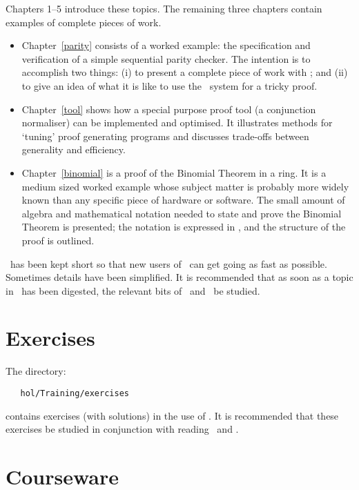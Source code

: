 Chapters 1--5 introduce these topics. The remaining three chapters
contain examples of complete pieces of work.
\begin{itemize}
\item Chapter~\ref{parity}
consists of a worked example: the specification and
verification of a simple sequential parity checker.  The intention is
to   accomplish two things:
(i) to present a complete piece of work with \HOL; and
(ii) to give an idea of what it is like to use the \HOL\
system for a tricky proof.  

\item Chapter~\ref{tool} shows how a special purpose proof tool (a conjunction
normaliser) can be implemented and optimised. It illustrates methods for
`tuning' proof generating programs and discusses trade-offs between generality
and efficiency.

\item Chapter~\ref{binomial} is a proof of the Binomial Theorem in a ring.  It
is a medium sized worked example whose subject matter is probably more widely
known than any specific piece of hardware or software. The small amount of
algebra and mathematical notation needed to state and prove the Binomial
Theorem is presented; the notation is expressed in \HOL{}, and the
structure of the proof is outlined.

\end{itemize}

\noindent \TUTORIAL\ has been kept short so that new users of \HOL\ can get
going as fast as possible. Sometimes details have been simplified. It is
recommended that as soon as a topic in \TUTORIAL\ has been digested, the
relevant bits of \DESCRIPTION\ and \REFERENCE\ be studied.

\section*{Exercises}

The directory:

\begin{hol}\begin{verbatim}
   hol/Training/exercises
\end{verbatim}\end{hol}

\noindent contains exercises (with solutions) in the use of \HOL. It is
recommended that these exercises be studied in conjunction with reading
\TUTORIAL\ and \DESCRIPTION.

\section*{Courseware}

